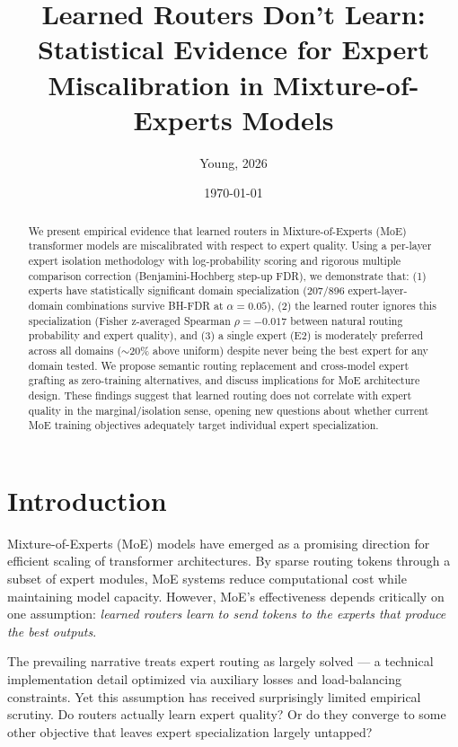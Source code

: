 \documentclass[11pt,a4paper]{article}
\title{Learned Routers Don't Learn: Statistical Evidence for Expert Miscalibration in Mixture-of-Experts Models}
\author{Young, 2026}
\date{\today}
\begin{document}
\maketitle

\begin{abstract}
We present empirical evidence that learned routers in Mixture-of-Experts (MoE) transformer models are miscalibrated with respect to expert quality. Using a per-layer expert isolation methodology with log-probability scoring and rigorous multiple comparison correction (Benjamini-Hochberg step-up FDR), we demonstrate that: (1) experts have statistically significant domain specialization (207/896 expert-layer-domain combinations survive BH-FDR at $\alpha=0.05$), (2) the learned router ignores this specialization (Fisher z-averaged Spearman $\rho = -0.017$ between natural routing probability and expert quality), and (3) a single expert (E2) is moderately preferred across all domains ($\sim$20\% above uniform) despite never being the best expert for any domain tested. We propose semantic routing replacement and cross-model expert grafting as zero-training alternatives, and discuss implications for MoE architecture design. These findings suggest that learned routing does not correlate with expert quality in the marginal/isolation sense, opening new questions about whether current MoE training objectives adequately target individual expert specialization.
\end{abstract}

\section{Introduction}

Mixture-of-Experts (MoE) models have emerged as a promising direction for efficient scaling of transformer architectures. By sparse routing tokens through a subset of expert modules, MoE systems reduce computational cost while maintaining model capacity. However, MoE's effectiveness depends critically on one assumption: \textit{learned routers learn to send tokens to the experts that produce the best outputs}.

The prevailing narrative treats expert routing as largely solved --- a technical implementation detail optimized via auxiliary losses and load-balancing constraints. Yet this assumption has received surprisingly limited empirical scrutiny. Do routers actually learn expert quality? Or do they converge to some other objective that leaves expert specialization largely untapped?
\end{document}
